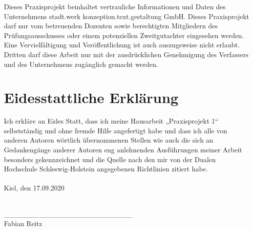 \documentclass[a4paper]{scrartcl}
\begin{document}

\onehalfspacing

Dieses Praxisprojekt beinhaltet vertrauliche Informationen und Daten des Unternehmens stadt.werk konzeption.text.gestaltung GmbH. Dieses Praxisprojekt darf nur vom betreuenden Dozenten sowie berechtigten Mitgliedern des Prüfungsausschusses oder einem potenziellen Zweitgutachter eingesehen werden. Eine Vervielfältigung und Veröffentlichung ist auch auszugsweise nicht erlaubt. Dritten darf diese Arbeit nur mit der ausdrücklichen Genehmigung des Verfassers und des Unternehmens zugänglich gemacht werden.

\vspace{8cm}

\section*{Eidesstattliche Erklärung}


\onehalfspacing

Ich erkläre an Eides Statt, dass ich meine Hausarbeit „Praxisprojekt 1“ selbstständig und ohne fremde Hilfe angefertigt habe und dass ich alle von anderen Autoren wörtlich übernommenen Stellen wie auch die sich an Gedankengänge anderer Autoren eng anlehnenden Ausführungen meiner Arbeit besonders gekennzeichnet und die Quelle nach den mir von der Dualen Hochschule Schleswig-Holstein angegebenen Richtlinien zitiert habe. \\ \\

Kiel, den 17.09.2020 \\ \\ 

\begin{tabbing}
	\_\_\_\_\_\_\_\_\_\_\_\_\_\_\_\_\_\_\_\_\_\_\_\_\_ \\
	Fabian Reitz
\end{tabbing}
\end{document}
